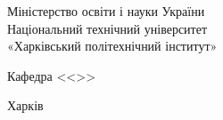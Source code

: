 \begin{titlepage}

\begin{center}
	Міністерство освіти і науки України \\
	Національний технічний університет \\
	«Харківський політехнічний інститут» \\
\end{center}

\vspace{1.5cm}

\begin{center}
	Кафедра <<\khpidepartment>> \\
\end{center}

\vspace{1.5cm}

\begin{center}
	\khpititlewhat
\end{center}

\vspace{1.5cm}

\begin{addmargin}[12cm]{0cm}
	\khpititlewho
\end{addmargin}

\vspace{\fill}

\begin{center}
	Харків \\
	\the\year
\end{center}

\end{titlepage}
